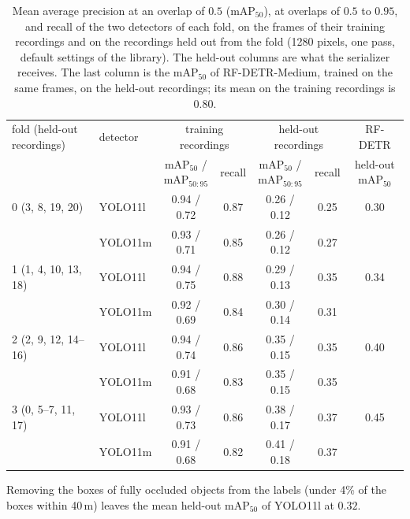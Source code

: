 \documentclass[10pt]{article}
\renewcommand{\thetable}{S\arabic{table}}
\newcommand{\settab}[1]{\setcounter{table}{#1}\addtocounter{table}{-1}\renewcommand{\thetable}{S\arabic{table}}}
\begin{document}
\settab{6}\begin{table}[h]\centering\footnotesize
\caption{Mean average precision at an overlap of $0.5$ (mAP$_{50}$), at overlaps of $0.5$ to $0.95$, and recall of the two detectors of each fold, on the frames of their training recordings and on the recordings held out from the fold (1280 pixels, one pass, default settings of the library). The held-out columns are what the serializer receives. The last column is the mAP$_{50}$ of RF-DETR-Medium, trained on the same frames, on the held-out recordings; its mean on the training recordings is $0.80$.}\label{tab:s6}
\begin{tabular}{@{}llccccc@{}}
\toprule
fold (held-out recordings) & detector & \multicolumn{2}{c}{training recordings} & \multicolumn{2}{c}{held-out recordings} & RF-DETR \\
 & & mAP$_{50}$ / mAP$_{50:95}$ & recall & mAP$_{50}$ / mAP$_{50:95}$ & recall & held-out mAP$_{50}$ \\ \midrule
0 (3, 8, 19, 20) & YOLO11l & 0.94 / 0.72 & 0.87 & 0.26 / 0.12 & 0.25 & 0.30 \\
 & YOLO11m & 0.93 / 0.71 & 0.85 & 0.26 / 0.12 & 0.27 & \\
1 (1, 4, 10, 13, 18) & YOLO11l & 0.94 / 0.75 & 0.88 & 0.29 / 0.13 & 0.35 & 0.34 \\
 & YOLO11m & 0.92 / 0.69 & 0.84 & 0.30 / 0.14 & 0.31 & \\
2 (2, 9, 12, 14--16) & YOLO11l & 0.94 / 0.74 & 0.86 & 0.35 / 0.15 & 0.35 & 0.40 \\
 & YOLO11m & 0.91 / 0.68 & 0.83 & 0.35 / 0.15 & 0.35 & \\
3 (0, 5--7, 11, 17) & YOLO11l & 0.93 / 0.73 & 0.86 & 0.38 / 0.17 & 0.37 & 0.45 \\
 & YOLO11m & 0.91 / 0.68 & 0.82 & 0.41 / 0.18 & 0.37 & \\
\bottomrule
\end{tabular}
\end{table}
Removing the boxes of fully occluded objects from the labels (under 4\% of the boxes within 40\,m) leaves the mean held-out mAP$_{50}$ of YOLO11l at $0.32$.
\end{document}
